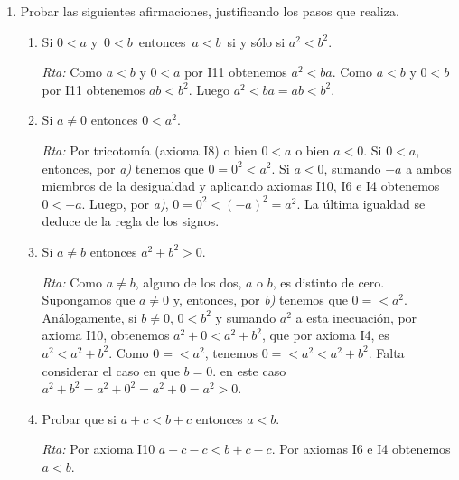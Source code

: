 \documentclass[12pt,spanish,makeidx]{amsbook}
\newcommand{\rta}{\noindent\textit{Rta: }}
\begin{document}
\begin{enumerate}
\begin{enumerate}
			\rta Sumamos $-c$  a la inecuación  $\,c<0$ y  obtenemos, por axioma I10,    $-c + c<-c + 0$, luego por axioma I6 en la parte izquierda y axioma I4 en la parte derecha, obtenemos $0 < -c$: Ahora bien  por axioma I11, $a<b\,$ y  $0 < -c$ implican $a \cdot (-c)<b \cdot (-c)$. Por la regla de los signos tenemos $-a \cdot c<- b \cdot c$. Sumando $a \cdot c$ y $ b \cdot c$  a ambos lados de la inecuación y aplicando axioma I10 y  repetidamente los axiomas I4 e I6, obtenemos  $\,b\cdot c<a\cdot c$.
		\end{enumerate}
		\medskip
		
		\item  Probar las siguientes afirmaciones, justificando los pasos que realiza.
		\begin{enumerate}
			\item Si $0 < a$  y $\,0<b\,$ entonces $\,a<b\,$ si y sólo si $a^2<b^2$.
			
			\rta  Como $a < b$ y $0 < a$ por I11 obtenemos $a^2 < ba$. Como $a < b$ y $0 < b$ por I11 obtenemos $ab < b^2$. Luego  $a^2 < ba = ab < b^2$.
			
			
			\item Si $a\neq 0$  entonces $0 < a^2$.
			
			\rta  Por tricotomía (axioma I8) o bien $0 <a$ o bien $a <0$. Si $0<a$, entonces, por \textit{a)} tenemos que $0 = 0^2 < a^2$.  Si $a<0$, sumando $-a$ a ambos miembros de la desigualdad y aplicando axiomas I10, I6 e I4 obtenemos $0 < -a$. Luego, por \textit{a)},  $0 = 0^2 < (-a)^2 = a^2$. La última igualdad se deduce de la regla de los signos. 
			
			\item Si $a\neq b$  entonces $a^2+b^2>0$.
			
			\rta Como $a\neq b$,  alguno de los dos, $a$ o $b$, es distinto de cero. Supongamos que $a \ne 0$ y, entonces, por  \textit{b)} tenemos que $0 = < a^2$. Análogamente, si $b \ne 0$, $0 < b^2$ y sumando  $a^2$  a esta inecuación, por axioma I10, obtenemos $a^2 + 0 <a^2 + b^2$, que por axioma I4, es $a^2  <a^2 + b^2$. Como $0 = < a^2$, tenemos $0 = < a^2 < a^2 + b^2$. Falta considerar el caso en que  $b =0$. en este caso $a^2 + b^2 = a^2 + 0^2 = a^2 + 0 = a^2 > 0$.
			
			
			
			
			\item Probar que si $a+c <b+c$ entonces $a<b$.
			
			\rta Por  axioma I10 $a+c -c  <b+c -c$. Por axiomas I6 e I4 obtenemos $a<b$.
		\end{enumerate}
		

\end{enumerate}
\end{document}
